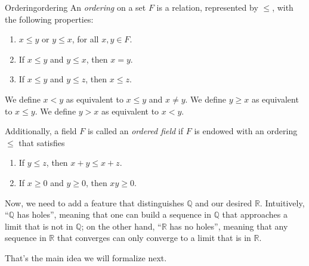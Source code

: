 \begin{defn}{Ordering}{ordering}
	An \emph{ordering} on a set \(F\) is a relation, represented by \(\leq\), with the following properties:
	\begin{enumerate}
		\item \(x \leq y\) or \(y \leq x\), for all \(x, y \in F\).
		\item If \(x \leq y\) and \(y \leq x\), then \(x = y\).
		\item If \(x \leq y\) and \(y \leq z\), then \(x \leq z\).
	\end{enumerate}

	We define \(x < y\) as equivalent to \(x \leq y\) and \(x \neq y\).
	We define \(y \geq x\) as equivalent to \(x \leq y\).
	We define \(y > x\) as equivalent to \(x < y\).

	Additionally, a field \(F\) is called an \emph{ordered field} if \(F\) is endowed with an ordering \(\leq\) that satisfies
	\begin{enumerate}[resume]
		\item If \(y \leq z\), then \(x + y \leq x + z\).
		\item If \(x \geq 0\) and \(y \geq 0\), then \(xy \geq 0\).
	\end{enumerate}
\end{defn}

Now, we need to add a feature that distinguishes \(\mathbb{Q}\) and our desired \(\mathbb{R}\).
Intuitively, ``\(\mathbb{Q}\) has holes'', meaning that one can build a sequence in \(\mathbb{Q}\) that approaches a limit that is not in \(\mathbb{Q}\); on the other hand, ``\(\mathbb{R}\) has no holes'', meaning that any sequence in \(\mathbb{R}\) that converges can only converge to a limit that is in \(\mathbb{R}\).

That's the main idea we will formalize next.

